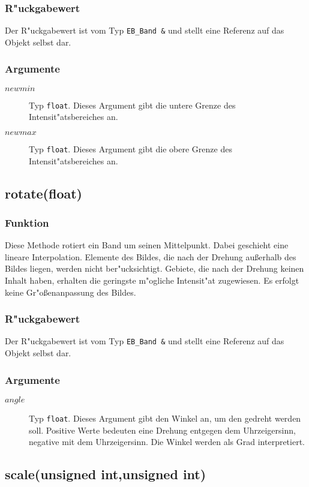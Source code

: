 \documentclass[12pt,a4paper,draft,twoside,onecolumn,titlepage]{book}
\newcommand{\carg}[1]{$ #1 $}
\newcommand{\ctyp}[1]{{\tt #1}}
\newcommand{\arglist}[1]{\footnotesize{#1}}
\begin{document}
\subsubsection{R"uckgabewert}
Der R"uckgabewert ist vom Typ \ctyp{EB\_Band \&} und stellt eine Referenz auf das Objekt selbst dar. 
\subsubsection{Argumente}
\begin{description}
\item[\carg{newmin}]{Typ \ctyp{float}. Dieses Argument gibt die untere Grenze des Intensit"atsbereiches an.}
\item[\carg{newmax}]{Typ \ctyp{float}. Dieses Argument gibt die obere Grenze des Intensit"atsbereiches an.}
\end{description}
\subsection{rotate\arglist{(float)}}
\subsubsection{Funktion}
Diese Methode rotiert ein Band um seinen Mittelpunkt. Dabei geschieht eine lineare Interpolation. Elemente des Bildes, die nach der Drehung au{\ss}erhalb des Bildes liegen, werden nicht ber"ucksichtigt. Gebiete, die nach der Drehung keinen Inhalt haben, erhalten die geringste m"ogliche Intensit"at zugewiesen. Es erfolgt keine Gr"o{\ss}enanpassung des Bildes.
\subsubsection{R"uckgabewert}
Der R"uckgabewert ist vom Typ \ctyp{EB\_Band \&} und stellt eine Referenz auf das Objekt selbst dar. 
\subsubsection{Argumente}
\begin{description}
\item[\carg{angle}]{Typ \ctyp{float}. Dieses Argument gibt den Winkel an, um den gedreht werden soll. Positive Werte bedeuten eine Drehung entgegen dem Uhrzeigersinn, negative mit dem Uhrzeigersinn. Die Winkel werden als Grad interpretiert.}
\end{description}
\subsection{scale\arglist{(unsigned int,unsigned int)}}
\end{document}
